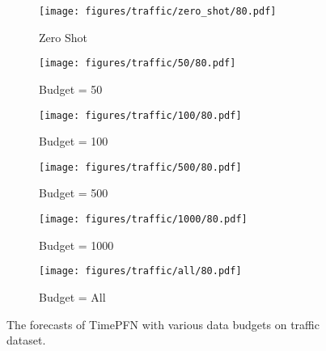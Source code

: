 \begin{figure*}[htp]
\centering

\begin{subfigure}{0.32\textwidth}
\texttt{[image: figures/traffic/zero\_shot/80.pdf]}
\caption{Zero Shot}
\end{subfigure}\hfill
\begin{subfigure}{0.32\textwidth}
\texttt{[image: figures/traffic/50/80.pdf]}
\caption{Budget = 50}
\end{subfigure}\hfill
\begin{subfigure}{0.32\textwidth}
\texttt{[image: figures/traffic/100/80.pdf]}
\caption{Budget = 100}
\end{subfigure}

\begin{subfigure}{0.32\textwidth}
\texttt{[image: figures/traffic/500/80.pdf]}
\caption{Budget = 500}
\end{subfigure}\hfill
\begin{subfigure}{0.32\textwidth}
\texttt{[image: figures/traffic/1000/80.pdf]}
\caption{Budget = 1000}
\end{subfigure}\hfill
\begin{subfigure}{0.32\textwidth}
\texttt{[image: figures/traffic/all/80.pdf]}
\caption{Budget = All}
\end{subfigure}

\caption{The forecasts of TimePFN with various data budgets on traffic dataset. }

\label{fig:traffic80}
\end{figure*}
